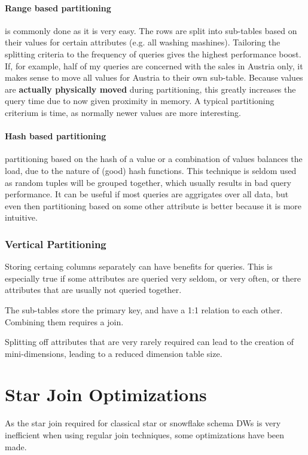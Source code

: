 \documentclass{article}
\begin{document}
\paragraph{Range based partitioning} is commonly done as it is very easy.
The rows are split into sub-tables based on their values for certain attributes (e.g. all washing mashines).
Tailoring the splitting criteria to the frequency of queries gives the highest performance boost.
If, for example, half of my queries are concerned with the sales in Austria only, it makes sense to move all values for Austria to their own sub-table.
Because values are \textbf{actually physically moved} during partitioning, this greatly increases the query time due to now given proximity in memory.
A typical partitioning criterium is time, as normally newer values are more interesting.

\paragraph{Hash based partitioning} partitioning based on the hash of a value or a combination of values balances the load, due to the nature of (good) hash functions.
This technique is seldom used as random tuples will be grouped together, which usually results in bad query performance.
It can be useful if most queries are aggrigates over all data, but even then partitioning based on some other attribute is better because it is more intuitive.

\subsubsection{Vertical Partitioning}
Storing certaing columns separately can have benefits for queries.
This is especially true if some attributes are queried very seldom, or very often, or there attributes that are usually not queried together.

The sub-tables store the primary key, and have a 1:1 relation to each other.
Combining them requires a join.

Splitting off attributes that are very rarely required can lead to the creation of mini-dimensions, leading to a reduced dimension table size.

\section{Star Join Optimizations}
As the star join required for classical star or snowflake schema DWs is very inefficient when using regular join techniques, some optimizations have been made.
\end{document}
